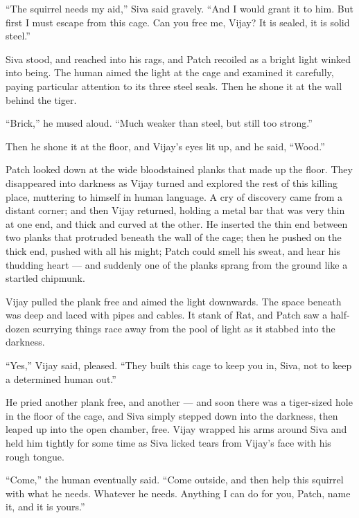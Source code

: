 \documentclass[ebook,oneside,openany,17pt]{memoir}
\newenvironment{tolerant}[1]{%
  \par\tolerance=#1\relax
}{%
  \par
}
\begin{document}
“The squirrel needs my aid,” Siva said gravely. “And I would grant it
to him. But first I must escape from this cage. Can you free me,
Vijay? It is sealed, it is solid steel.”

\begin{tolerant}{2000}
Siva stood, and reached into his rags, and Patch recoiled as a bright
light winked into being. The human aimed the light at the cage and
examined it carefully, paying particular attention to its three steel
seals. Then he shone it at the wall behind the tiger.
\end{tolerant}

“Brick,” he mused aloud. “Much weaker than steel, but still too
strong.”

Then he shone it at the floor, and Vijay’s eyes lit up, and he said,
“Wood.”

\begin{tolerant}{5000}
Patch looked down at the wide bloodstained planks that made up the
floor. They disappeared into darkness as Vijay turned and explored the
rest of this killing place, muttering to himself in human language. A
cry of discovery came from a distant corner; and then Vijay returned,
holding a metal bar that was very thin at one end, and thick and
curved at the other. He inserted the thin end between two planks that
protruded beneath the wall of the cage; then he pushed on the thick
end, pushed with all his might; Patch could smell his sweat, and hear
his thudding heart — and suddenly one of the planks sprang from the
ground like a startled chipmunk.
\end{tolerant}

Vijay pulled the plank free and aimed the light downwards. The space
beneath was deep and laced with pipes and cables. It stank of Rat, and
Patch saw a half-dozen scurrying things race away from the pool of
light as it stabbed into the darkness.

“Yes,” Vijay said, pleased. “They built this cage to keep you in,
Siva, not to keep a determined human out.”

He pried another plank free, and another — and soon there was a
tiger-sized hole in the floor of the cage, and Siva simply stepped
down into the darkness, then leaped up into the open chamber,
free. Vijay wrapped his arms around Siva and held him tightly for some
time as Siva licked tears from Vijay’s face with his rough tongue.

“Come,” the human eventually said. “Come outside, and then help this
squirrel with what he needs. Whatever he needs. Anything I can do for
you, Patch, name it, and it is yours.”
\end{document}

